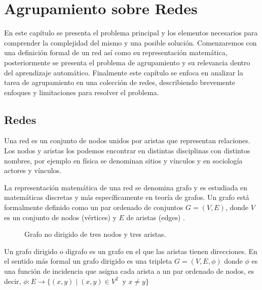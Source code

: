 
\chapter{Agrupamiento sobre Redes} %
\label{chapter:2}


En este capítulo se presenta el problema principal y los elementos necesarios para comprender la complejidad del mismo y una posible solución. Comenzaremos con una definición formal de un red así como su representación matemática, posteriormente se presenta el problema de agrupamiento y su relevancia dentro del aprendizaje automático. Finalmente este capítulo se enfoca en analizar la tarea de agrupamiento en una colección de redes, describiendo brevemente enfoques y limitaciones para resolver el problema. 

\section{Redes}

Una red es un conjunto de nodos unidos por aristas que representan relaciones. Los nodos y aristas los podemos encontrar en distintas disciplinas con distintos nombres, por ejemplo en física se denominan sitios y vínculos y en sociología actores y vínculos. 

La representación matemática de una red se denomina grafo y es estudiada en matemáticas discretas y más específicamente en teoría de grafos. Un grafo está formalmente definido como un par ordenado de conjuntos $G = (V,E)$, donde $V$ es un conjunto de nodos (vértices) y $E$ de aristas (edges) \cite{saoub_graph_2021}.

 \begin{figure}[htbp]
   \centering
   
    \caption{Grafo no dirigido de tres nodos y tres aristas.}
    \label{fig:graph}
\end{figure}

Un grafo dirigido o digrafo es un grafo en el que las aristas tienen direcciones. En el sentido más formal un grafo dirigido es una tripleta $G = (V,E,\phi)$ donde $\phi$ es una función de incidencia que asigna cada arista a un par ordenado de nodos, es decir, $ \phi :E \to \{(x,y)\mid (x,y)\in V^{2}\ \mbox{ y } x \neq y \}$

